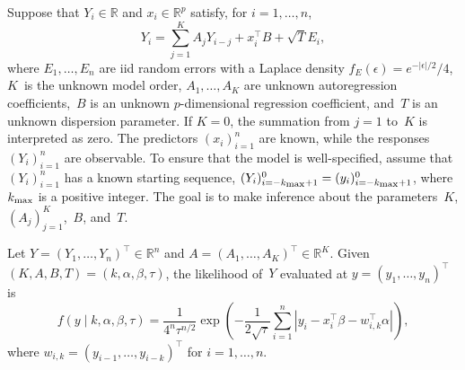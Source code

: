 \documentclass[12pt]{article}
\begin{document}
	
	Suppose that $Y_i \in \mathbb{R}$ and $x_i \in \mathbb{R}^p$ satisfy, for $i = 1, \dots, n$, 
	\[
	Y_i = \sum_{j=1}^K A_j Y_{i-j} + x_i^{\top} B + \sqrt{T} E_i,
	\]
	where $E_1, \dots, E_n$ are iid random errors with a Laplace density $f_E(\epsilon) = e^{-|\epsilon|/2}/4$, $K$~is the unknown model order, $A_1, \dots, A_K$ are unknown autoregression coefficients,~$B$ is an unknown $p$-dimensional regression coefficient, and~$T$ is an unknown dispersion parameter.
	If $K = 0$, the summation from $j = 1$ to~$K$ is interpreted as zero.
	The predictors $(x_i)_{i=1}^n$ are known, while the responses $(Y_i)_{i=1}^n$ are observable.
	To ensure that the model is well-specified, assume that $(Y_i)_{i=1}^n$ has a known starting sequence, $(Y_i)_{i=-k_{\scriptsize \mbox{max}} + 1}^0 = (y_i)_{i=-k_{\scriptsize \mbox{max}} + 1}^0$, where $k_{\scriptsize \mbox{max}}$ is a positive integer.
	The goal is to make inference about the parameters~$K$, $(A_j)_{j=1}^K$,~$B$, and~$T$.
	
	
	
	
	
	Let $Y = (Y_1, \dots, Y_n)^{\top} \in \mathbb{R}^n$ and $A = (A_1, \dots, A_K)^{\top} \in \mathbb{R}^K$.
	Given $(K,A,B,T) = (k,\alpha, \beta, \tau)$, the likelihood of~$Y$ evaluated at $y = (y_1, \dots, y_n)^{\top}$ is
	\[
	f(y \mid k, \alpha, \beta, \tau) = \frac{1}{4^n \tau^{n/2}} \exp \left( - \frac{1}{2\sqrt{\tau}} \sum_{i=1}^n \left|y_i - x_i^{\top} \beta - w_{i,k}^{\top} \alpha \right| \right),
	\] 
	where  $w_{i,k} = (y_{i-1}, \dots, y_{i-k})^{\top}$ for $i = 1,\dots,n$.
	
	
	
\end{document}
